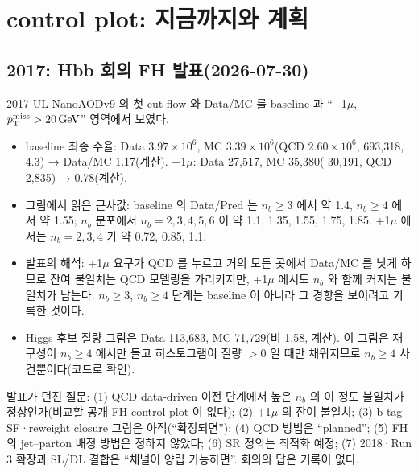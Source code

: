 \section{control plot: 지금까지와 계획}\label{sec:selection-control}

\subsection{2017: Hbb 회의 FH 발표(2026-07-30)}
2017 UL NanoAODv9 의 첫 cut-flow 와 Data/MC 를 baseline 과 ``+1$\mu$, $p_{\mathrm{T}}^{\mathrm{miss}}>20\,\mathrm{GeV}$'' 영역에서 보였다.
\begin{itemize}
\item baseline 최종 수율: Data $3.97\times10^6$, MC $3.39\times10^6$(QCD $2.60\times10^6$, \ttbar{} 693,318, \ttHH{} 4.3) → Data/MC 1.17(계산).
      +1$\mu$: Data 27,517, MC 35,380(\ttbar{} 30,191, QCD 2,835) → 0.78(계산).
\item 그림에서 읽은 근사값: baseline 의 Data/Pred 는 $n_b\ge3$ 에서 약 1.4, $n_b\ge4$ 에서 약 1.55; $n_b$ 분포에서 $n_b=2,3,4,5,6$ 이 약
      1.1, 1.35, 1.55, 1.75, 1.85. +1$\mu$ 에서는 $n_b=2,3,4$ 가 약 0.72, 0.85, 1.1.
\item 발표의 해석: +1$\mu$ 요구가 QCD 를 누르고 거의 모든 곳에서 Data/MC 를 낫게 하므로 잔여 불일치는 QCD 모델링을 가리키지만, +1$\mu$ 에서도
      $n_b$ 와 함께 커지는 불일치가 남는다. $n_b\ge3$, $n_b\ge4$ 단계는 baseline 이 아니라 그 경향을 보이려고 기록한
      것이다.
\item Higgs 후보 질량 그림은 Data 113,683, MC 71,729(비 1.58, 계산). 이 그림은 \chisq{} 재구성이 $n_b\ge4$ 에서만 돌고
      히스토그램이 질량 $>0$ 일 때만 채워지므로 $n_b\ge4$ 사건뿐이다(코드로 확인).
\end{itemize}
발표가 던진 질문: (1) QCD data-driven 이전 단계에서 높은 $n_b$ 의 이 정도 불일치가 정상인가(비교할 공개 FH control plot 이 없다); (2) +1$\mu$ 의
잔여 불일치; (3) b-tag SF·reweight closure 그림은 아직(``확정되면''); (4) QCD 방법은 ``planned''; (5) FH 의 jet–parton 배정 방법은 정하지 않았다;
(6) SR 정의는 최적화 예정; (7) 2018·Run 3 확장과 SL/DL 결합은 ``채널이 양립 가능하면''.
회의의 답은 기록이 없다.

